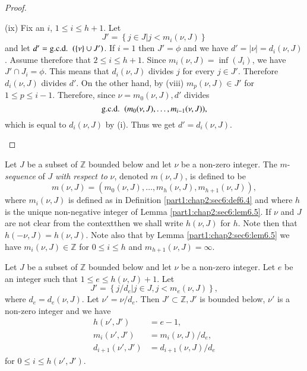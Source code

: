 \begin{proof}
\begin{enumerate}[(i)]
(ix) Fix an $i$, $1 \leq i \leq h+1$. Let 
$$
J' = \left\{ j \in J \Big| j < m_i(\nu, J)\right\}
$$ 
and let $d' = \text{\gcd}~ ( \{ \nu\} \cup J')$. If $i=1$ then $J' = \phi$ and we have $d' = |\nu| = d_i (\nu, J)$. Assume therefore that $2 \leq i \leq h+1$. Since $m_i (\nu, J)= \inf (J_i)$, we have $J' \cap J_i = \phi$. This means that $d_i (\nu, J)$ divides $j$ for every $j \in J'$. Therefore $d_i (\nu, J)$ divides $d'$. On the other hand, by (viii) $m_p (\nu, J) \in J'$ for $1 \leq p \leq i-1$. Therefore, since $\nu = m_0 (\nu, J), d'$ divides
$$
\text{\gcd}~ (m_0 (\nu, J) , \ldots , m_{i-1} (\nu, J)),
$$
which is equal to $d_i (\nu, J)$ by (i). Thus we get $d' = d_i (\nu, J)$.
\end{enumerate}
\end{proof}

\begin{defi}\label{part1:chap2:sec6:def6.6}
  Let $J$ be a subset of $\mathbb{Z}$ bounded below and let $\nu$ be a non-zero integer. The $m$-{\em sequence} of $J$ {\em with respect to} $\nu$, denoted $m (\nu, J)$, is defined to be 
$$
m(\nu, J)= (m_0 (\nu, J), \ldots , m_h (\nu, J), m_{h+1} (\nu, J)),
$$
where $m_i (\nu, J)$ is defined as in Definition \ref{part1:chap2:sec6:def6.4} and where $h$ is the unique non-negative integer of Lemma \ref{part1:chap2:sec6:lem6.5}. If $\nu$ and $J$ are not clear from the context\pageoriginale then we shall write $h (\nu, J)$ for $h$. Note then that $h (- \nu, J)= h(\nu, J)$. Note also that by Lemma \ref{part1:chap2:sec6:lem6.5} we have $m_i (\nu, J) \in \mathbb{Z}$ for $0 \leq i \leq h$ and $m_{h+1}(\nu, J)= \infty$.
\end{defi}

\begin{lemma}\label{part1:chap2:sec6:lem6.7}
  Let $J$ be a subset of $\mathbb{Z}$ bounded below and let $\nu$ be a non-zero integer. Let $e$ be an integer such that $1 \leq e \leq h (\nu, J)+1$. Let 
$$
J' = \left\{ j/ d_e \Big| j \in J, j < m_e (\nu, J)\right\},
$$
where $d_e = d_e (\nu, J)$. Let $\nu'= \nu/ d_e$. Then $J' \subset \mathbb{Z}, J'$ is bounded below, $\nu'$ is a non-zero integer and we have
\begin{align*}
  h (\nu', J') & = e-1,\\
  m_i (\nu' , J') & = m_i (\nu, J)/d_e,\\
  d_{i+1} (\nu', J') & = d_{i+1} (\nu, J)/ d_e
\end{align*}
for $0 \leq i \leq h(\nu', J')$.
\end{lemma}

